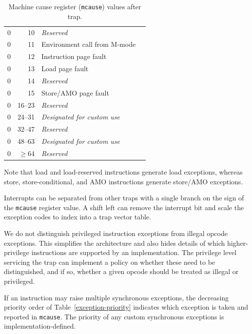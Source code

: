 \begin{table}[htbp]
\begin{center}
\begin{tabular}{|r|r|l|l|}
  0         & 10              & {\em Reserved} \\
  0         & 11              & Environment call from M-mode \\
  0         & 12              & Instruction page fault \\
  0         & 13              & Load page fault \\
  0         & 14              & {\em Reserved} \\
  0         & 15              & Store/AMO page fault \\
  0         & 16--23          & {\em Reserved} \\
  0         & 24--31          & {\em Designated for custom use} \\
  0         & 32--47          & {\em Reserved} \\
  0         & 48--63          & {\em Designated for custom use} \\
  0         & $\ge$64         & {\em Reserved} \\
  \hline

\end{tabular}
\end{center}
\caption{Machine cause register ({\tt mcause}) values after trap.}
\label{mcauses}
\end{table}

Note that load and load-reserved instructions generate load exceptions,
whereas store, store-conditional, and AMO instructions generate store/AMO
exceptions.

\begin{commentary}
Interrupts can be separated from other traps with a single branch on the sign of
the {\tt mcause} register value.  A shift left can remove the
interrupt bit and scale the exception codes to index into a trap
vector table.
\end{commentary}

\begin{commentary}
We do not distinguish privileged instruction exceptions from illegal
opcode exceptions.  This simplifies the architecture and also hides
details of which higher-privilege instructions are supported by an
implementation.  The privilege level servicing the trap can implement
a policy on whether these need to be distinguished, and if so, whether
a given opcode should be treated as illegal or privileged.
\end{commentary}

If an instruction may raise multiple synchronous exceptions, the
decreasing priority order of Table~\ref{exception-priority}
indicates which exception is taken and reported in {\tt mcause}.
The priority of any custom synchronous exceptions is implementation-defined.

